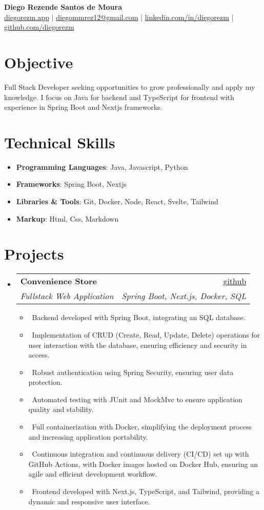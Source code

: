 \documentclass[letterpaper,10pt]{article}
\makeatletter
\newcommand{\resumeItem}[1]{\item\small{#1}}
\newcommand{\resumeSubheading}[4]{
\vspace{-1pt}\item
  \begin{tabular*}{0.97\textwidth}[t]{l@{\extracolsep{\fill}}r}
    \textbf{#1} & #2 \\
    \textit{#3} & \textit{#4} \\
  \end{tabular*}\vspace{-7pt}
}
\newcommand{\resumeSubHeadingList}{\begin{itemize}[leftmargin=0.15in, label={}]}
\newcommand{\resumeSubHeadingListEnd}{\end{itemize}}
\makeatother
\begin{document}
\begin{center}
  \textbf{\Huge Diego Rezende Santos de Moura} \\
  \small \href{https://diegorezm.netlify.app/}{diegorezm.app} $|$ \href{mailto:diegommrez12@gmail.com}{diegommrez12@gmail.com} $|$ 
  \href{https://linkedin.com/in/diegorezm}{linkedin.com/in/diegorezm} $|$
  \href{https://github.com/diegorezm}{github.com/diegorezm}
\end{center}

\section*{Objective}
Full Stack Developer seeking opportunities to grow professionally and apply my knowledge. I focus on Java for backend and TypeScript for frontend with experience in Spring Boot and Nextjs frameworks.

\section{Technical Skills}
\resumeSubHeadingList
  \resumeItem{\textbf{Programming Languages}: Java, Javascript, Python}
  \resumeItem{\textbf{Frameworks}: Spring Boot, Nextjs}
  \resumeItem{\textbf{Libraries \& Tools}: Git, Docker, Node, React, Svelte, Tailwind}
  \resumeItem{\textbf{Markup}: Html, Css, Markdown}
\resumeSubHeadingListEnd

\section{Projects}
\resumeSubHeadingList
  \resumeSubheading
      {Convenience Store}{\href{https://github.com/diegorezm/convenience.store.api}{github}} 
      {Fullstack Web Application}{Spring Boot, Next.js, Docker, SQL}
      \resumeSubHeadingList
          \resumeItem{\textbullet\ Backend developed with Spring Boot, integrating an SQL database.}
          \resumeItem{\textbullet\ Implementation of CRUD (Create, Read, Update, Delete) operations for user interaction with the database, ensuring efficiency and security in access.}
          \resumeItem{\textbullet\ Robust authentication using Spring Security, ensuring user data protection.}
          \resumeItem{\textbullet\ Automated testing with JUnit and MockMvc to ensure application quality and stability.}
          \resumeItem{\textbullet\ Full containerization with Docker, simplifying the deployment process and increasing application portability.}
          \resumeItem{\textbullet\ Continuous integration and continuous delivery (CI/CD) set up with GitHub Actions, with Docker images hosted on Docker Hub, ensuring an agile and efficient development workflow.}
          \resumeItem{\textbullet\ Frontend developed with Next.js, TypeScript, and Tailwind, providing a dynamic and responsive user interface.}
      \resumeSubHeadingListEnd
\resumeSubHeadingListEnd
\end{document}
